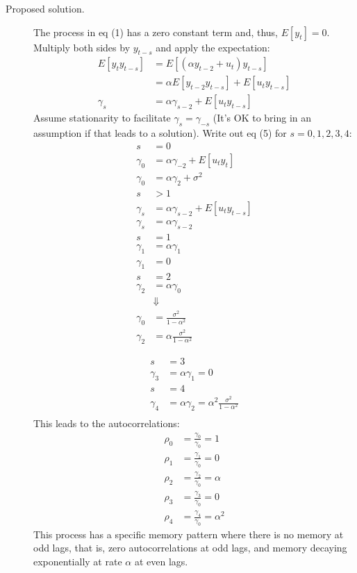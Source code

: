 \documentclass[12pt]{article}
\begin{document}
\begin{adjustwidth}{1cm}{1cm}
\begin{description}
\bigskip\item[Proposed solution.]  The process in eq (1) has a zero constant term and, thus, $E[y_t] = 0$. Multiply both sides by $y_{t-s}$ and apply the expectation:
\begin{align}
E[y_ty_{t-s}] &= E[(\alpha y_{t-2} + u_t)y_{t-s}]\\
&= \alpha E[y_{t-2}y_{t-s}] +  E[u_ty_{t-s}]\\
\gamma_s &= \alpha \gamma_{s-2} +  E[u_ty_{t-s}]
\end{align}
Assume stationarity to facilitate $\gamma_{s}=\gamma_{-s}$ (It's OK to bring in an assumption if that leads to a solution). Write out eq (5) for $s = 0,1,2,3,4$:
\begin{align}
s &= 0\\
\gamma_0 &= \alpha \gamma_{-2} +  E[u_ty_{t}]\\
\gamma_0 &= \alpha \gamma_{2} +  \sigma^2 \\[1ex]
s &>1\\
\gamma_s &= \alpha \gamma_{s-2} +  E[u_ty_{t-s}]\\
\gamma_s &= \alpha \gamma_{s-2} \\[1ex]
s &= 1\\
\gamma_1 &= \alpha \gamma_{1} \\
\gamma_1 &= 0\\[1ex]
s &= 2\\
\gamma_2 &= \alpha \gamma_{0} \\
&\Downarrow\\
\gamma_0 &= \frac{\sigma^2}{1-\alpha^2}\\
\gamma_2 &= \alpha\frac{\sigma^2}{1-\alpha^2}
\end{align}

\begin{align}
s &= 3\\
\gamma_3 &= \alpha \gamma_{1} = 0 \\[1ex]
s &= 4\\
\gamma_4 &= \alpha \gamma_{2} = \alpha^2 \frac{\sigma^2}{1-\alpha^2}\\[1ex]
\end{align}
This leads to the autocorrelations:
\begin{align}
\rho_0 &= \frac{\gamma_0}{\gamma_0} = 1\\
\rho_1 &= \frac{\gamma_1}{\gamma_0} = 0\\
\rho_2 &= \frac{\gamma_2}{\gamma_0} = \alpha\\
\rho_3 &= \frac{\gamma_3}{\gamma_0} = 0\\
\rho_4 &= \frac{\gamma_4}{\gamma_0} = \alpha^2
\end{align}
This process has a specific memory pattern where there is no memory at odd lags, that is, zero autocorrelations at odd lags, and memory decaying exponentially at rate $\alpha$ at even lags.
\end{description} 


\end{adjustwidth}
\end{document}
